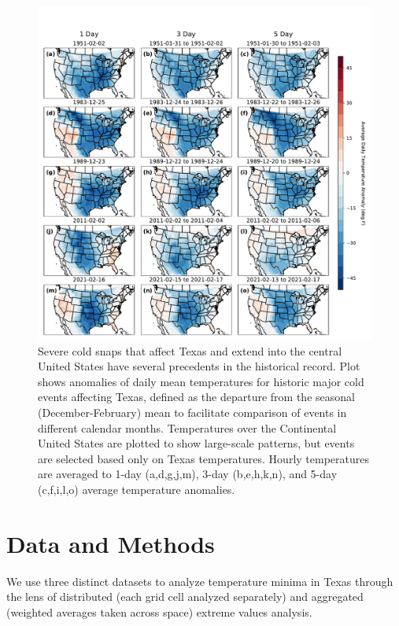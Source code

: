 \documentclass[12pt]{iopart}
\begin{document}
\begin{figure}
  \centering
  \includegraphics[width=\textwidth]{historic_events_era5.pdf}
  \caption{
    Severe cold snaps that affect Texas and extend into the central United States have several precedents in the historical record.
    Plot shows anomalies of daily mean temperatures for historic major cold events affecting Texas, defined as the departure from the seasonal (December-February) mean to facilitate comparison of events in different calendar months.
    Temperatures over the Continental United States are plotted to show large-scale patterns, but events are selected based only on Texas temperatures.
    Hourly temperatures are averaged to 1-day (a,d,g,j,m), 3-day (b,e,h,k,n), and 5-day (c,f,i,l,o) average temperature anomalies.
  }\label{fig:historic_era5}
\end{figure}

\section{Data and Methods}

We use three distinct datasets to analyze temperature minima in Texas through the lens of distributed (each grid cell analyzed separately) and aggregated (weighted averages taken across space) extreme values analysis.
\end{document}
